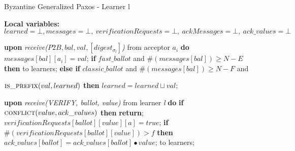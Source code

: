 \begin{algorithm}
	\caption{Byzantine Generalized Paxos - Learner l}
	\textbf{Local variables: } $learned = \bot, messages = \bot,\ verificationRequests = \bot,\ ackMessages = \bot,\ ack\_values = \bot$ 
	\begin{algorithmic}[1]
		\State \textbf{upon} \textit{receive($P2B, bal, val, [digest_{\sigma_l}]$)} from acceptor $a_i$ \textbf{do}
		\State \hspace{\algorithmicindent} $messages[bal][a_i] = val$;
		\State \hspace{\algorithmicindent} \textbf{if} $fast\_ballot$ and $\#(messages[bal]) \geq N-E$ \textbf{then}
		\State\hspace{\algorithmicindent}\hspace{\algorithmicindent}  to learners;
		\State \hspace{\algorithmicindent} \textbf{else if} $classic\_ballot$ and $\#(messages[bal]) \geq N-F$ and
		\item[] \hspace{\algorithmicindent}\hspace{\algorithmicindent}$\Call{is\_prefix}{val, learned}$ \textbf{then}
		\State \hspace{\algorithmicindent} \hspace{\algorithmicindent} $learned = learned \sqcup val$;
		
		\State 
		\State \textbf{upon} \textit{receive(VERIFY, ballot, value)} from learner \textit{l} \textbf{do}
		\State \hspace{\algorithmicindent}\textbf{if} $\Call{conflict}{value, ack\_values}$ \textbf{then}
		\State\hspace{\algorithmicindent}\hspace{\algorithmicindent}\textbf{return};
		\State
		\State\hspace{\algorithmicindent}$verificationRequests[ballot][value][a] = true$;
		\State\hspace{\algorithmicindent}\textbf{if} $\#(verificationRequests[ballot][value]) > f$ \textbf{then}
		\State\hspace{\algorithmicindent} \hspace{\algorithmicindent}	$ack\_values[ballot] = ack\_values[ballot] \bullet value$;
		\State \hspace{\algorithmicindent} \hspace{\algorithmicindent}  to learners;
		

\end{algorithmic}
\end{algorithm}
